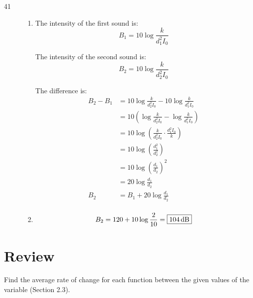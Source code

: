 \documentclass{exam}
\begin{document}
    \ifprintanswers
      \begin{description}
        \item[41]
          \begin{enumerate}[a]
            \item 
              The intensity of the first sound is:
              \[
                B_1 = 10 \log \frac{k}{d_1^2 I_0} 
              \]

              The intensity of the second sound is:
              \[
                B_2 = 10 \log \frac{k}{d_2^2 I_0} 
              \]

              The difference is:
              \begin{align*}
                B_2 - B_1 & = 10 \log \frac{k}{d_2^2 I_0} - 10 \log \frac{k}{d_1^2 I_0} \\
                          & = 10 \left( \log \frac{k}{d_2^2 I_0} - \log \frac{k}{d_1^2 I_0} \right) \\
                          & = 10 \log \left( \frac{k}{d_2^2 I_0} \cdot \frac{d_1^2 I_0}{k} \right) \\
                          & = 10 \log \left( \frac{d_1^2}{d_2^2} \right) \\
                          & = 10 \log \left( \frac{d_1}{d_2} \right)^2 \\
                          & = 20 \log \frac{d_1}{d_2} \\
                B_2       & = B_1 + 20 \log \frac{d_1}{d_2} \\
              \end{align*}

            \item
              \[
                B_2 = 120 + 10 \log \frac{2}{10} = \boxed{\unit[104]{dB}} 
              \]
          \end{enumerate}
      \end{description}
    \fi

    \section{Review}

    Find the average rate of change for each function between the given values of the variable (Section 2.3).
\end{document}
